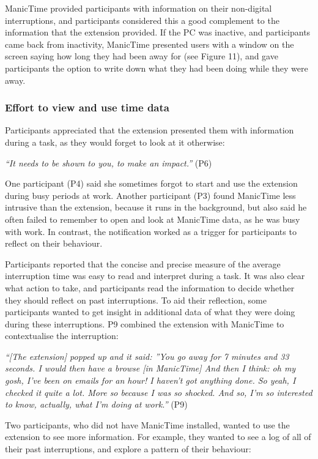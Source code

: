 ManicTime provided participants with information on their non-digital interruptions, and participants considered this a good complement to the information that the extension provided. If the PC was inactive, and participants came back from inactivity, ManicTime presented users with a window on the screen saying how long they had been away for (see Figure 11), and gave participants the option to write down what they had been doing while they were away.

\subsubsection{Effort to view and use time data}
Participants appreciated that the extension presented them with information during a task, as they would forget to look at it otherwise:

\textit{“It needs to be shown to you, to make an impact.”} (P6)

One participant (P4) said she sometimes forgot to start and use the extension during busy periods at work. Another participant (P3) found ManicTime less intrusive than the extension, because it runs in the background, but also said he often failed to remember to open and look at ManicTime data, as he was busy with work. In contrast, the notification worked as a trigger for participants to reflect on their behaviour.

Participants reported that the concise and precise measure of the average interruption time was easy to read and interpret during a task. It was also clear what action to take, and participants read the information to decide whether they should reflect on past interruptions. To aid their reflection, some participants wanted to get insight in additional data of what they were doing during these interruptions. P9 combined the extension with ManicTime to contextualise the interruption:

\textit{“[The extension] popped up and it said: ”You go away for 7 minutes and 33 seconds. I would then have a browse [in ManicTime] And then I think: oh my gosh, I've been on emails for an hour! I haven't got anything done. So yeah, I checked it quite a lot. More so because I was so shocked. And so, I'm so interested to know, actually, what I'm doing at work.”} (P9)

Two participants, who did not have ManicTime installed, wanted to use the extension to see more information. For example, they wanted to see a log of all of their past interruptions, and explore a pattern of their behaviour:

